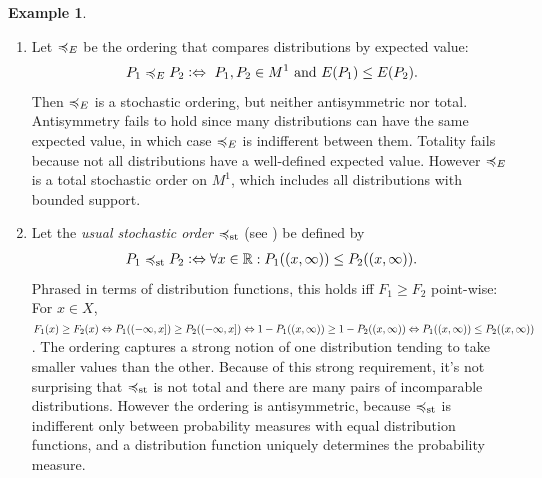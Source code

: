 \documentclass[a4paper]{scrreprt}
\newcommand{\M}{M}
\theoremstyle{definition}
\newtheorem{ex}[thm]{Example} %
\begin{document}
    \begin{ex}~
        \begin{enumerate}
            \item 
            Let $\preccurlyeq_E$ be the ordering that compares distributions by expected value:
            \begin{gather*}
                P_1 \leqE P_2 \colonlra \text{ $P_1, P_2 \in \M^1$ and $E(P_1) \leq E(P_2)$}.
            \end{gather*}
            Then $\preccurlyeq_E$ is a stochastic ordering, but neither antisymmetric nor total. Antisymmetry fails to hold since many distributions can have the same expected value, in which case $\preccurlyeq_E$ is indifferent between them. Totality fails because not all distributions have a well-defined expected value. However $\preccurlyeq_E$ is a total stochastic order on $\M^1$, which includes all distributions with bounded support.
            
            \item Let the \emph{usual stochastic order} $\preccurlyeq_{\text{st}}$ (see \cite{bib:shakedStochasticOrders}) be defined by 
            \begin{gather*}
                P_1 \preccurlyeq_{\text{st}} P_2 \mathrel{\vcentcolon\Leftrightarrow} \forall x \in \mathbb{R}: P_1((x, \infty)) \leq P_2((x, \infty)).
            \end{gather*}
            Phrased in terms of distribution functions, this holds iff $F_1 \geq F_2$ point-wise: For $x \in X$, $F_1(x) \geq F_2(x) \Leftrightarrow P_1((-\infty, x]) \geq P_2((-\infty, x]) \Leftrightarrow 1 - P_1((x, \infty)) \geq 1 - P_2((x, \infty)) \Leftrightarrow P_1((x, \infty)) \leq P_2((x, \infty))$. The ordering captures a strong notion of one distribution tending to take smaller values than the other. Because of this strong requirement, it's not surprising that $\preccurlyeq_{\text{st}}$ is not total and there are many pairs of incomparable distributions. However the ordering is antisymmetric, because $\preccurlyeq_{\text{st}}$ is indifferent only between probability measures with equal distribution functions, and a distribution function uniquely determines the probability measure.
        \end{enumerate}
    \end{ex}

    \let\dpref\dgeq
    \let\dnonpref\dleq
    \let\dstrpref\dgreater
    \let\dstrnonpref\dless
    
\end{document}
